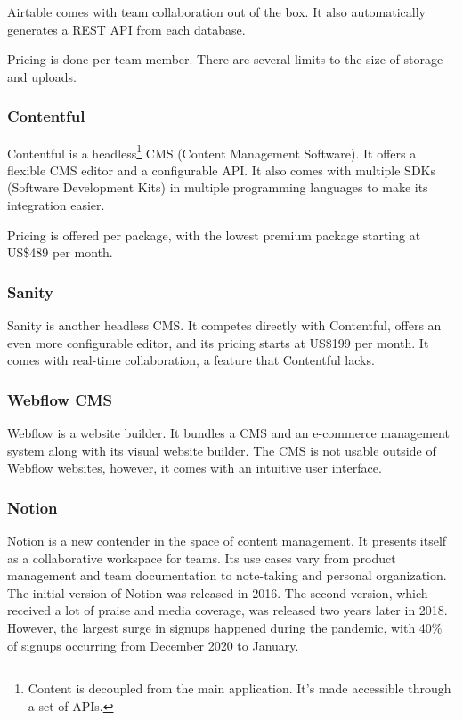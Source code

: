 Airtable comes with team collaboration out of the box. It also
automatically generates a REST API from each database.

Pricing is done per team member. There are several limits to the size of
storage and uploads.

\subsubsection{Contentful}


Contentful is a headless\footnote{Content is decoupled from the main
	application. It's made accessible through a set of APIs.} CMS (Content
Management Software). It offers a flexible CMS editor and a configurable
API. It also comes with multiple SDKs (Software Development Kits) in
multiple programming languages to make its integration easier.

Pricing is offered per package, with the lowest premium package starting
at US\$489 per month.

\subsubsection{Sanity}


Sanity is another headless CMS. It competes directly with Contentful,
offers an even more configurable editor, and its pricing starts at
US\$199 per month. It comes with real-time collaboration, a feature that
Contentful lacks.

\subsubsection{Webflow CMS}


Webflow is a website builder. It bundles a CMS and an e-commerce
management system along with its visual website builder. The CMS is not
usable outside of Webflow websites, however, it comes with an intuitive
user interface.

\subsubsection{Notion}


Notion is a new contender in the space of content management. It
presents itself as a collaborative workspace for teams. Its use cases
vary from product management and team documentation to note-taking and
personal organization. The initial version of Notion was released in
2016. The second version, which received a lot of praise and media
coverage, was released two years later in 2018. However, the largest
surge in signups happened during the pandemic, with 40\% of signups
occurring from December 2020 to January.

